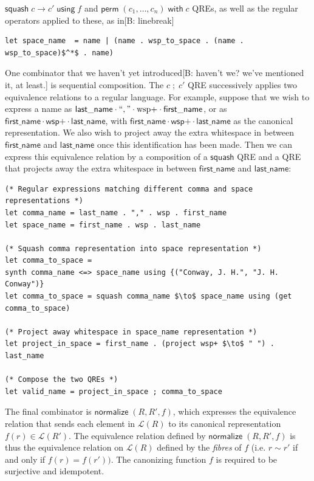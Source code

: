\documentclass[acmsmall,review,anonymous]{acmart}
\newcommand{\FINISH}[3]{\ifdraft\textcolor{#1}{[#2: #3]}\fi}
\newcommand{\bcp}[1]{\FINISH{dkred}{B}{#1}}
\newcommand{\kw}[1]{\ensuremath{\mathsf{#1}}}
\newcommand{\squash}[3]{\ensuremath{\kw{squash} \; #1 \rightarrow #2\; \kw{using} \; #3}}
\newcommand{\perm}[2]{\ensuremath{\kw{perm}\; (#1)\; \kw{with}\; #2}}
\newcommand{\normalize}[3]{\ensuremath{\kw{normalize} \; (#1, #2, #3)}}
\newcommand{\semicolon}{\ensuremath{\; ; \;}}
\begin{document}
\noindent $\squash{c}{c'}{f}$ and $\perm{c_1, \ldots, c_n}{c}$ QREs, as well as
the regular operators applied to these, as in\bcp{linebreak}

\begin{lstlisting}
let space_name  = name | (name . wsp_to_space . (name . wsp_to_space)$^*$ . name)
\end{lstlisting}

One combinator that we haven't yet introduced\bcp{haven't we? we've
  mentioned it, at least.} is sequential composition.
The $c \semicolon c'$ QRE successively applies
two equivalence relations to a regular language. For example, suppose that
we wish to express a name as $\kw{last\_name \cdot ``,\text{''} \cdot
\text{wsp+} \cdot first\_name}$, or as $\kw{first\_name\cdot \text{wsp+} \cdot
last\_name}$, with $\kw{first\_name\cdot \text{wsp+} \cdot last\_name}$ as the
canonical representation. We also wish to project away the extra whitespace in
between \kw{first\_name} and \kw{last\_name} once this identification has been
made. Then we can express this equivalence relation by a composition of a
\kw{squash} QRE and a QRE that projects away the extra whitespace in between
\kw{first\_name} and \kw{last\_name}:


\begin{lstlisting}
(* Regular expressions matching different comma and space representations *)
let comma_name = last_name . "," . wsp . first_name
let space_name = first_name . wsp . last_name

(* Squash comma representation into space representation *)
let comma_to_space =
synth comma_name <=> space_name using {("Conway, J. H.", "J. H. Conway")}
let comma_to_space = squash comma_name $\to$ space_name using (get comma_to_space)

(* Project away whitespace in space_name representation *)
let project_in_space = first_name . (project wsp+ $\to$ " ") . last_name

(* Compose the two QREs *)
let valid_name = project_in_space ; comma_to_space
\end{lstlisting}

The final combinator is $\normalize{R}{R'}{f}$, which expresses
the equivalence relation that sends each element in $\mathcal{L}(R)$ to its
canonical representation $f(r) \in \mathcal{L}(R')$. The equivalence relation
defined by $\normalize{R}{R'}{f}$ is thus the equivalence relation on
$\mathcal{L}(R)$ defined by the {\em fibres} of $f$ (i.e. $r \sim r'$ if and
only if $f(r) = f(r'))$. The canonizing function $f$ is required to be
surjective and idempotent.
\end{document}
